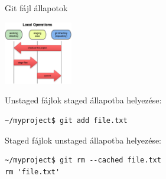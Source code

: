 
\begin{frame}[fragile]{Git fájl állapotok}
    \pause
    \begin{center}
        \includegraphics[width=3cm]{frames/diagrams/three-states.png}
    \end{center}
    
    \pause
    Unstaged fájlok staged állapotba helyezése:
\begin{verbatim}
~/myproject$ git add file.txt
\end{verbatim}

    \pause
    Staged fájlok unstaged állapotba helyezése:
\begin{verbatim}
~/myproject$ git rm --cached file.txt
rm 'file.txt'
\end{verbatim}
\end{frame}

